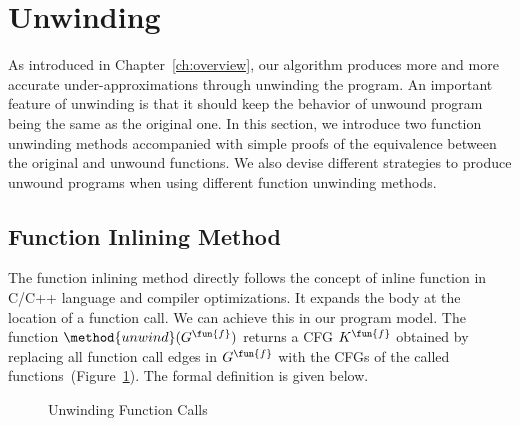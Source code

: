 
\section{Unwinding}\label{sec:unwinding}
As introduced in Chapter~\ref{ch:overview}, our algorithm produces more and more
accurate under-approximations through unwinding the program.
An important feature of unwinding is that it should keep the behavior of unwound
program being the same as the original one.
In this section, we introduce two function unwinding methods accompanied with
simple proofs of the equivalence between the original and unwound functions.
We also devise different strategies to produce unwound programs when using
different function unwinding methods.

\subsection{Function Inlining Method}\label{subsec:inlining}
The function inlining method directly follows the concept of inline function in
C/C++ language and compiler optimizations.
It expands the body at the location of a function call.
We can achieve this in our program model.
The function $\method{unwind}(G^\fun{f})$ returns a CFG $K^\fun{f}$
obtained by replacing all function call edges in $G^\fun{f}$ with the CFGs of
the called functions~(Figure~\ref{figure:unwinding}).
The formal definition is given below.

\begin{figure}[t]
  \centering

  \caption{Unwinding Function Calls}
  \label{figure:unwinding}
\end{figure}

